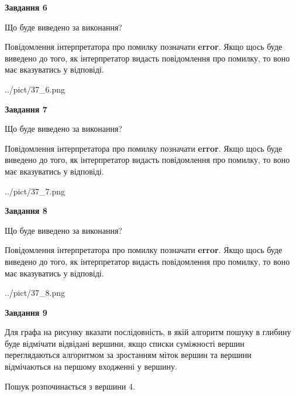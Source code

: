 \documentclass[12pt, ukrainian]{article}
\begin{document}
{\begin {large}
{\begin {center}\textbf{Завдання 6}\end {center}}\par
Що буде виведено за виконання?

Повідомлення інтерпретатора про помилку позначати \textbf{error}.
Якщо щось буде виведено до того, як інтерпретатор видасть повідомлення про помилку, 
то воно має вказуватись у відповіді. \par


\begin{center}
	{../pict/37_6.png}
\end{center}
\newpage

{\begin {center}\textbf{Завдання 7}\end {center}}\par
Що буде виведено за виконання?

Повідомлення інтерпретатора про помилку позначати \textbf{error}.
Якщо щось буде виведено до того, як інтерпретатор видасть повідомлення про помилку, 
то воно має вказуватись у відповіді. \par


\begin{center}
	{../pict/37_7.png}
\end{center}
\newpage

{\begin {center}\textbf{Завдання 8}\end {center}}\par
Що буде виведено за виконання?

Повідомлення інтерпретатора про помилку позначати \textbf{error}.
Якщо щось буде виведено до того, як інтерпретатор видасть повідомлення про помилку, 
то воно має вказуватись у відповіді. \par


\begin{center}
	{../pict/37_8.png}
\end{center}
\newpage

{\begin {center}\textbf{Завдання 9}\end {center}}\par
Для графа на рисунку вказати послідовність, в якій алгоритм пошуку в глибину буде відмічати відвідані вершини, якщо списки суміжності вершин переглядаються алгоритмом за зростанням міток вершин та вершини відмічаються на першому вход\-женні у вершину.\par
Пошук розпочинається з вершини 4.\par


\end{large}}
\end{document}
